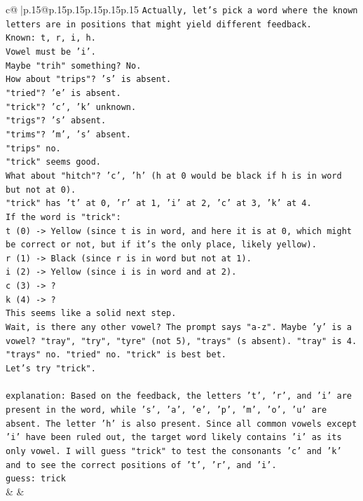 \documentclass{article}
\begin{document}
{\begin{supertabular}{c@{$\;$}|p{.15\linewidth}@{}p{.15\linewidth}p{.15\linewidth}p{.15\linewidth}p{.15\linewidth}p{.15\linewidth}}
{{{\texttt{Actually, let's pick a word where the known letters are in positions that might yield different feedback.} \\
\texttt{Known: t, r, i, h.} \\
\texttt{Vowel must be 'i'.} \\
\texttt{Maybe "trih" something? No.} \\
\texttt{How about "trips"? 's' is absent.} \\
\texttt{"tried"? 'e' is absent.} \\
\texttt{"trick"? 'c', 'k' unknown.} \\
\texttt{"trigs"? 's' absent.} \\
\texttt{"trims"? 'm', 's' absent.} \\
\texttt{"trips" no.} \\
\texttt{"trick" seems good.} \\
\texttt{What about "hitch"? 'c', 'h' (h at 0 would be black if h is in word but not at 0).} \\
\texttt{"trick" has 't' at 0, 'r' at 1, 'i' at 2, 'c' at 3, 'k' at 4.} \\
\texttt{If the word is "trick":} \\
\texttt{t (0) {-}> Yellow (since t is in word, and here it is at 0, which might be correct or not, but if it's the only place, likely yellow).} \\
\texttt{r (1) {-}> Black (since r is in word but not at 1).} \\
\texttt{i (2) {-}> Yellow (since i is in word and at 2).} \\
\texttt{c (3) {-}> ?} \\
\texttt{k (4) {-}> ?} \\
\texttt{This seems like a solid next step.} \\
\texttt{Wait, is there any other vowel? The prompt says "a{-}z". Maybe 'y' is a vowel? "tray", "try", "tyre" (not 5), "trays" (s absent). "tray" is 4. "trays" no. "tried" no. "trick" is best bet.} \\
\texttt{Let's try "trick".} \\
\\ 
\texttt{explanation: Based on the feedback, the letters 't', 'r', and 'i' are present in the word, while 's', 'a', 'e', 'p', 'm', 'o', 'u' are absent. The letter 'h' is also present. Since all common vowels except 'i' have been ruled out, the target word likely contains 'i' as its only vowel. I will guess "trick" to test the consonants 'c' and 'k' and to see the correct positions of 't', 'r', and 'i'.} \\
\texttt{guess: trick} \\
            }
        }
    }
    & & \\ \\


\end{supertabular}}
\end{document}
